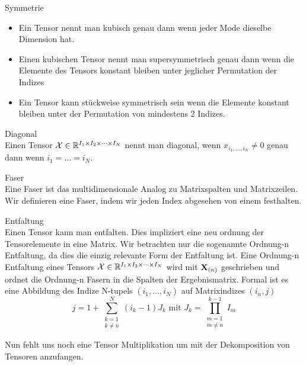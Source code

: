 \begin{Bemerkung} Symmetrie \\
\begin{itemize}
\item Ein Tensor nennt man kubisch genau dann wenn jeder Mode dieselbe Dimension hat. 
\item Einen kubischen Tensor nennt man supersymmetrisch genau dann wenn die Elemente des Tensors konstant bleiben unter jeglicher Permutation der Indizes
\item Ein Tensor kann stückweise symmetrisch sein wenn die Elemente konstant bleiben unter der Permutation von mindestens 2 Indizes.
\end{itemize}
\end{Bemerkung}

\begin{Definition} Diagonal \\
Einen Tensor ${\cal X}  \in \mathbb{R}^{I_1 \times I_2 \times \dots \times I_N}$ nennt man diagonal, wenn
$x_{i_1,\dots,i_N} \neq 0$ genau dann wenn $i_1 = \dots = i_N$.
\end{Definition}

\begin{Definition} Faser \\
Eine Faser ist das multidimensionale Analog zu Matrixspalten und Matrixzeilen. Wir definieren eine Faser, indem wir jeden Index abgesehen von einem festhalten.
\end{Definition}

\begin{Bemerkung} Entfaltung \\
Einen Tensor kann man entfalten. Dies impliziert eine neu ordnung der Tensorelemente in eine Matrix.
Wir betrachten nur die sogenannte Ordnung-n Entfaltung, da dies die einzig relevante Form der Entfaltung ist.
Eine Ordnung-n Entfaltung eines Tensors ${\cal X}  \in \mathbb{R}^{I_1 \times I_2 \times \dots \times I_N}$ wird mit $\bold{X}_{(n)}$ geschrieben und ordnet die Ordnung-n Fasern in die Spalten der Ergebnismatrix.
Formal ist es eine Abbildung des Indize N-tupels $(i_1,\dots,i_N)$ auf Matrixindizes $(i_n,j) $
\begin{equation}
j=1+\sum_{\substack{k=1 \\ k \neq n}}^{N} (i_k-1)J_k \text{ mit } J_k = \prod_{\substack{m=1 \\ m \neq n}}^{k-1} I_m
\end{equation}
\end{Bemerkung}

Nun fehlt uns noch eine Tensor Multiplikation um mit der Dekomposition von Tensoren anzufangen. 

